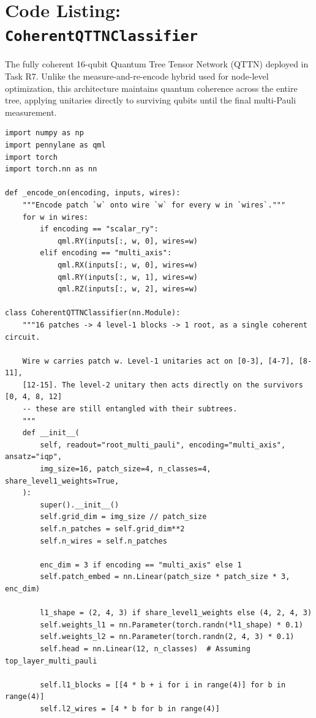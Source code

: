 \documentclass[12pt, a4paper, oneside]{report}
\begin{document}
\section*{Code Listing: \texttt{CoherentQTTNClassifier}}
The fully coherent 16-qubit Quantum Tree Tensor Network (QTTN) deployed in Task R7. Unlike the measure-and-re-encode hybrid used for node-level optimization, this architecture maintains quantum coherence across the entire tree, applying unitaries directly to surviving qubits until the final multi-Pauli measurement.

\begin{verbatim}
import numpy as np
import pennylane as qml
import torch
import torch.nn as nn

def _encode_on(encoding, inputs, wires):
    """Encode patch `w` onto wire `w` for every w in `wires`."""
    for w in wires:
        if encoding == "scalar_ry":
            qml.RY(inputs[:, w, 0], wires=w)
        elif encoding == "multi_axis":
            qml.RX(inputs[:, w, 0], wires=w)
            qml.RY(inputs[:, w, 1], wires=w)
            qml.RZ(inputs[:, w, 2], wires=w)

class CoherentQTTNClassifier(nn.Module):
    """16 patches -> 4 level-1 blocks -> 1 root, as a single coherent circuit.
    
    Wire w carries patch w. Level-1 unitaries act on [0-3], [4-7], [8-11],
    [12-15]. The level-2 unitary then acts directly on the survivors [0, 4, 8, 12] 
    -- these are still entangled with their subtrees.
    """
    def __init__(
        self, readout="root_multi_pauli", encoding="multi_axis", ansatz="iqp",
        img_size=16, patch_size=4, n_classes=4, share_level1_weights=True,
    ):
        super().__init__()
        self.grid_dim = img_size // patch_size
        self.n_patches = self.grid_dim**2
        self.n_wires = self.n_patches
        
        enc_dim = 3 if encoding == "multi_axis" else 1
        self.patch_embed = nn.Linear(patch_size * patch_size * 3, enc_dim)
        
        l1_shape = (2, 4, 3) if share_level1_weights else (4, 2, 4, 3)
        self.weights_l1 = nn.Parameter(torch.randn(*l1_shape) * 0.1)
        self.weights_l2 = nn.Parameter(torch.randn(2, 4, 3) * 0.1)
        self.head = nn.Linear(12, n_classes)  # Assuming top_layer_multi_pauli

        self.l1_blocks = [[4 * b + i for i in range(4)] for b in range(4)]
        self.l2_wires = [4 * b for b in range(4)]


\end{verbatim}
\end{document}
